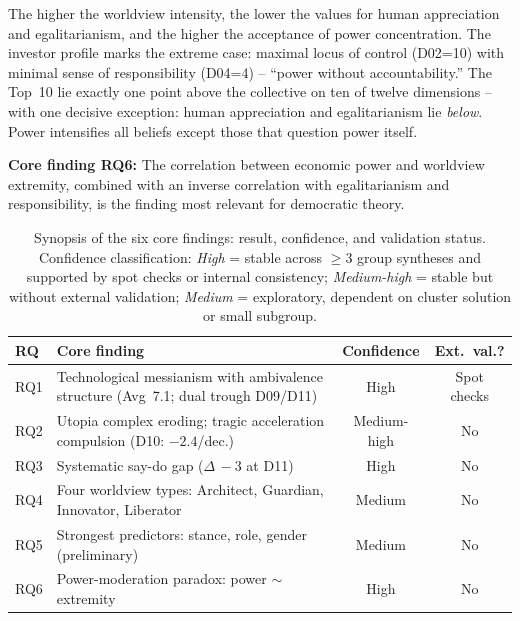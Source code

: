 \documentclass[12pt,a4paper]{article}
\begin{document}
The higher the worldview intensity, the lower the values for human appreciation and egalitarianism, and the higher the acceptance of power concentration. The investor profile marks the extreme case: maximal locus of control (D02=10) with minimal sense of responsibility (D04=4) -- ``power without accountability.'' The Top~10 lie exactly one point above the collective on ten of twelve dimensions -- with one decisive exception: human appreciation and egalitarianism lie \emph{below}. Power intensifies all beliefs except those that question power itself.

\medskip
\noindent\textbf{Core finding RQ6:} The correlation between economic power and worldview extremity, combined with an inverse correlation with egalitarianism and responsibility, is the finding most relevant for democratic theory.



\begin{table}[htbp]
  \centering
  \caption{Synopsis of the six core findings: result, confidence, and validation status. Confidence classification: \emph{High} = stable across $\geq 3$ group syntheses and supported by spot checks or internal consistency; \emph{Medium-high} = stable but without external validation; \emph{Medium} = exploratory, dependent on cluster solution or small subgroup.}
  \label{tab:synopse}
  \footnotesize
  \begin{tabularx}{\textwidth}{l X c c}
    \toprule
    \textbf{RQ} & \textbf{Core finding} & \textbf{Confidence} & \textbf{Ext.\ val.?} \\
    \midrule
    RQ1 & Technological messianism with ambivalence structure (Avg~7.1; dual trough D09/D11) & High & Spot checks \\
    RQ2 & Utopia complex eroding; tragic acceleration compulsion (D10: $-2.4$/dec.) & Medium-high & No \\
    RQ3 & Systematic say-do gap ($\Delta\,-3$ at D11) & High & No \\
    RQ4 & Four worldview types: Architect, Guardian, Innovator, Liberator & Medium & No \\
    RQ5 & Strongest predictors: stance, role, gender (preliminary) & Medium & No \\
    RQ6 & Power-moderation paradox: power $\sim$ extremity & High & No \\
    \bottomrule
  \end{tabularx}
\end{table}
\end{document}
